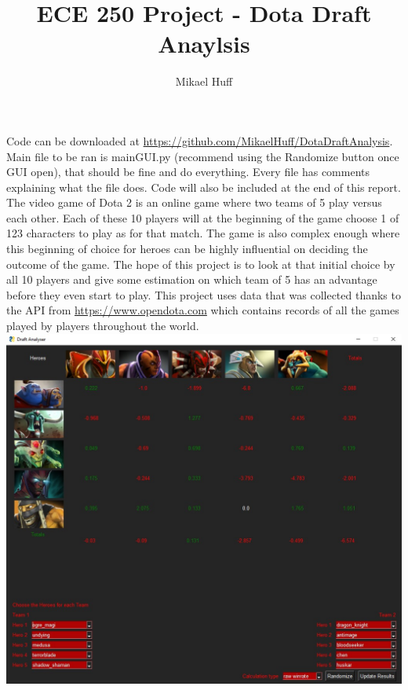 \documentclass{article}
\title{ECE 250 Project - Dota Draft Anaylsis}
\author{Mikael Huff}
\date{}
\begin{document}
\maketitle


Code can be downloaded at \url{https://github.com/MikaelHuff/DotaDraftAnalysis}. Main file to be ran is mainGUI.py (recommend using the Randomize button once GUI open), that should be fine and do everything. Every file has comments explaining what the file does. Code will also be included at the end of this report. \\

The video game of Dota 2 is an online game where two teams of 5 play versus each other. Each of these 10 players will at the beginning of the game choose 1 of 123 characters to play as for that match. The game is also complex enough where this beginning of choice for heroes can be highly influential on deciding the outcome of the game. The hope of this project is to look at that initial choice by all 10 players and give some estimation on which team of 5 has an advantage before they even start to play. This project uses data that was collected thanks to the API from \url{https://www.opendota.com} which contains records of all the games played by players throughout the world. \\

\includegraphics[width=15cm]{FullShot.jpg}
\end{document}
